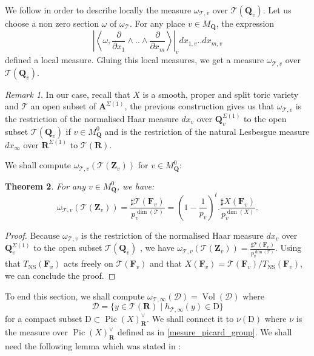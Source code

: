 \documentclass{proc-l}
\newcommand{\R}{\mathbf{R}}
\newcommand{\Z}{\mathbf{Z}}
\newcommand{\Q}{\mathbf{Q}}
\newcommand{\F}{\mathbf{F}}
\DeclareMathOperator{\Pic}{Pic}
\DeclareMathOperator{\Vol}{Vol}
\DeclareMathOperator{\NS}{NS}
\newcommand{\stackT}{\mathcal{T}}
\newcommand{\affine}{\mathbf{A}}
\newcommand{\w}{\omega}
\newtheorem{theorem}{Theorem}[section]
\theoremstyle{definition}
\theoremstyle{remark}
\newtheorem{remark}[theorem]{Remark}
\numberwithin{equation}{section}
\begin{document}
We follow \cite[construction 4.25]{Peyre_beyond_height} in order to describe locally the measure $\w_{\stackT,v}$ over $\stackT(\Q_v)$. Let us choose a non zero section $\w$ of $\w_{\stackT}$. For any place $v \in M_{\Q}$, the expression
$$ \left| \left\langle \w , \frac{\partial}{\partial x_1} \wedge .. \wedge \frac{\partial}{\partial x_m} \right\rangle \right|_v d x_{1,v}.. d x_{m,v} $$defined a local measure. Gluing this local measures, we get a measure $\w_{\stackT,v}$ over $\stackT(\Q_v)$. 

\begin{remark}\label{intrepretation_mesure_universal_torsor}
    In our case, recall that $X$ is a smooth, proper and split toric variety and $\stackT$ an open subset of $\affine^{\Sigma(1)}$, the previous construction gives us that $\w_{\stackT,v}$ is the restriction of the normalised Haar measure $d x_v$ over $\Q_v^{\Sigma(1)}$ to the open subset $\stackT(\Q_v)$ if $v \in M_{\Q}^0$ and is the restriction of the natural Lesbesgue measure $d x_{\infty}$ over $\R^{\Sigma(1)}$ to $\stackT(\R)$. 
\end{remark}

We shall compute $\w_{\stackT,v}(\stackT(\Z_v))$ for $v \in M_{\Q}^0$:

\begin{theorem}\label{mesure_torseur_univ_tamagawa_number_toric}
    For any $v \in M_{\Q}^0$, we have:
    $$\w_{\stackT,v}(\stackT(\Z_v)) = \frac{\sharp \stackT(\F_v)}{p_v^{\dim(\stackT)}} =  \left( 1 - \frac{1}{p_v} \right)^t . \frac{\sharp X( \F_v) }{p_v^{\dim(X)}} .$$
\end{theorem}

\begin{proof}
    Because $\w_{\stackT,v}$ is the restriction of the normalised Haar measure $d x_v$ over $\Q_v^{\Sigma(1)}$ to the open subset $\stackT(\Q_v)$ , we have $\w_{\stackT,v}(\stackT(\Z_v)) = \frac{\sharp \stackT(\F_v)}{p_v^{\dim(\stackT)}}$. Using that $T_{\NS}(\F_v)$ acts freely on $\stackT(\F_v)$ and that $X(\F_v) = \stackT(\F_v) / T_{\NS}(\F_v)$,  we can conclude the proof.
\end{proof}

To end this section, we shall compute $\w_{\stackT,\infty}(\mathcal{D}) = \Vol(\mathcal{D})$ where $$\mathcal{D} = \{ y \in \stackT(\R) \mid h_{\stackT,\infty}(y) \in \mathrm{D} \}$$ for a compact subset $\mathrm{D} \subset \Pic(X)^{\vee}_{\R}$. We shall connect it to $\nu(\mathrm{D})$ where $\nu$ is the measure over $\Pic(X)^{\vee}_{\R}$ defined as in \ref{mesure_picard_group}. We shall need the following lemma which was stated in \cite[4.4.1]{peyre_zeta_height_function}:
\end{document}
